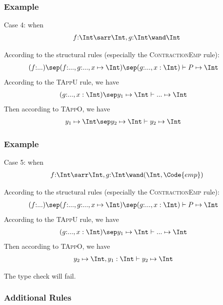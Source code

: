 \begin{frame}[fragile]
    \frametitle{Example}
    
    Case 4: when
    \begin{align*}
        f{:}\Int \sarr \Int, g{:}\Int \wand \Int
    \end{align*}

    According to the structural rules (especially the \textsc{ContractionEmp} rule):
    \begin{align*}
        &(f{:}...) \sep (f{:}..., g{:}..., x \mapsto \Int) \sep (g{:}..., x:\Int) \vdash P \mapsto \Int
    \end{align*}
    According to the \textsc{TAppU} rule, we have
    \begin{align*}
        &(g{:}..., x:\Int) \sep y_1\mapsto\Int \vdash ... \mapsto \Int
    \end{align*}
    Then according to \textsc{TAppO}, we have
    \begin{align*}
        &y_1\mapsto\Int \sep y_2 \mapsto \Int \vdash y_2 \mapsto \Int
    \end{align*}
\end{frame}

\begin{frame}[fragile]
    \frametitle{Example}
    
    Case 5: when
    \begin{align*}
        f{:}\Int \sarr \Int, g{:}\Int \wand (\Int, \Code{emp})
    \end{align*}

    According to the structural rules (especially the \textsc{ContractionEmp} rule):
    \begin{align*}
        &(f{:}...) \sep (f{:}..., g{:}..., x \mapsto \Int) \sep (g{:}..., x:\Int) \vdash P \mapsto \Int
    \end{align*}
    According to the \textsc{TAppU} rule, we have
    \begin{align*}
        &(g{:}..., x:\Int) \sep y_1\mapsto\Int \vdash ... \mapsto \Int
    \end{align*}
    Then according to \textsc{TAppO}, we have
    \begin{align*}
        & y_2 \mapsto \Int , y_1:\Int \vdash y_2 \mapsto \Int
    \end{align*}

    The type check will fail.
\end{frame}

\begin{frame}[fragile]
    \frametitle{Additional Rules}   

    \begin{figure}[!ht]
    \end{figure}
\end{frame}

